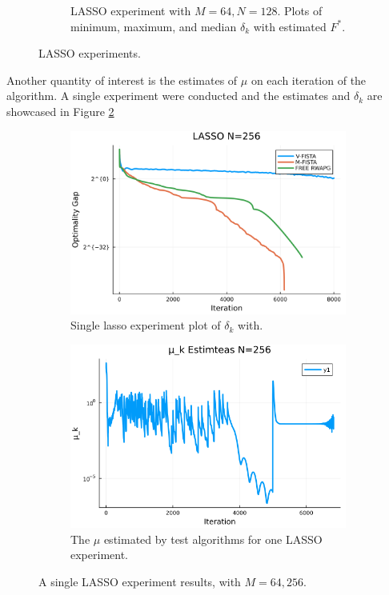\documentclass[12pt]{article}
\begin{document}
\begin{figure}[H]
\begin{subfigure}[b]{0.47\textwidth}
                    \caption{LASSO experiment with $M = 64, N = 128$. Plots of minimum, maximum, and median $\delta_k$ with estimated $F^*$. }
                \end{subfigure}
                \caption{LASSO experiments. }
                \label{fig:batched-lasso}
            \end{figure}
            \par
            Another quantity of interest is the estimates of $\mu$ on each iteration of the algorithm. 
            A single experiment were conducted and the estimates and $\delta_k$ are showcased in Figure \ref{fig:single-lass-mu-estimates}
            \begin{figure}[H]
                \begin{subfigure}[b]{0.47\textwidth}
                    \includegraphics[width=\textwidth]{assets/lasso_loss_256.png}
                    \caption{Single lasso experiment plot of $\delta_k$ with.  }
                \end{subfigure}
                \hfill
                \begin{subfigure}[b]{0.47\textwidth}
                    \includegraphics[width=\textwidth]{assets/lasso_sc_estimates_256.png}
                    \caption{The $\mu$ estimated by test algorithms for one LASSO experiment. }
                \end{subfigure}
                \caption{A single LASSO experiment results, with $M = 64, 256$. }
                \label{fig:single-lass-mu-estimates}
            \end{figure}
\end{document}
